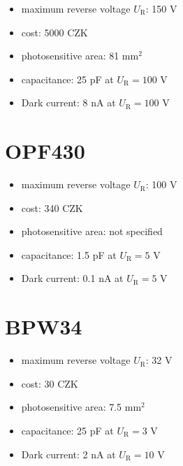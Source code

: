 \begin{itemize}
\item maximum reverse voltage $U_\textrm{R}$: 150 V
\item cost: 5000 CZK
\item photosensitive area: 81 mm$^2$
\item capacitance: 25 pF at $U_\textrm{R} = 100$ V
\item Dark current: 8 nA at $U_\textrm{R} = 100$ V
\end{itemize}

\section{OPF430}

\begin{itemize}
\item maximum reverse voltage $U_\textrm{R}$: 100 V
\item cost: 340 CZK
\item photosensitive area: not specified
\item capacitance: 1.5  pF at $U_\textrm{R} = 5$ V
\item Dark current: 0.1 nA at $U_\textrm{R} = 5$ V
\end{itemize}

\section{BPW34}

\begin{itemize}
\item maximum reverse voltage $U_\textrm{R}$: 32 V
\item cost: 30 CZK
\item photosensitive area: 7.5 mm$^2$
\item capacitance: 25 pF at $U_\textrm{R} = 3$ V
\item Dark current: 2 nA at $U_\textrm{R} = 10$ V
\end{itemize}

